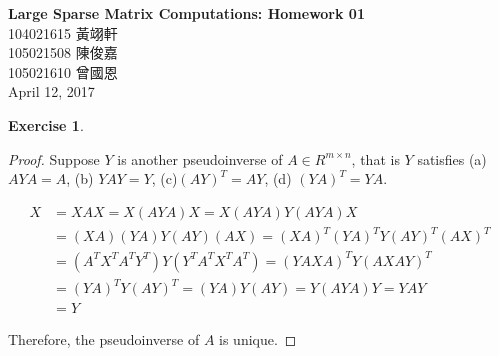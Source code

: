\documentclass[11pt,a4paper]{article}
\renewcommand{\(}{\left(}
\renewcommand{\)}{\right)}
\renewcommand{\title}{Large Sparse Matrix Computations: Homework 01}
\renewcommand{\author}{104021615 黃翊軒\\105021508	陳俊嘉\\105021610 曾國恩}
\renewcommand{\maketitle}{\begin{center}\textbf{\Large\title}\\[6pt] {\author}\\[6pt] {\color{Gray}\footnotesize April 12, 2017}\end{center}}
\newtheorem{exercise}{Exercise}
\begin{document}
  \maketitle
  
  \setcounter{exercise}{0}
  
  \begin{exercise}
  \end{exercise}  
  \begin{proof}
  	Suppose $Y$ is another pseudoinverse of $A\in R^{m\times n}$, that is $Y$
  	satisfies (a) $AYA=A$, (b) $YAY=Y$, (c)$\left( AY\right) ^{T}=AY$, (d) $%
  	\left( YA\right) ^{T}=YA$.
  	
  	\begin{align*}
  	X &=XAX=X\left( AYA\right) X=X\left( AYA\right) Y(AYA)X\\
  	&=\left( XA\right)
  	\left( YA\right) Y\left( AY\right) \left( AX\right) =\left( XA\right)
  	^{T}\left( YA\right) ^{T}Y\left( AY\right) ^{T}\left( AX\right) ^{T} \\
  	&=\left( A^{T}X^{T}A^{T}Y^{T}\right) Y\left( Y^{T}A^{T}X^{T}A^{T}\right)
  	=\left( YAXA\right) ^{T}Y\left( AXAY\right) ^{T}\\
  	&=\left( YA\right)
  	^{T}Y\left( AY\right) ^{T}=\left( YA\right) Y\left( AY\right) =Y\left(
  	AYA\right) Y=YAY\\
  	&=Y
  	\end{align*}

  	
  	Therefore, the pseudoinverse of $A$ is unique.
  \end{proof}  
\end{document}
